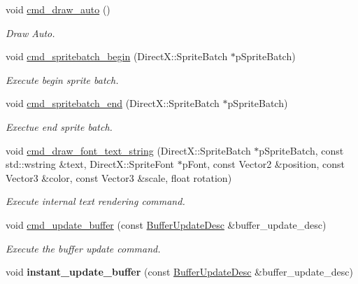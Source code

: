 \begin{DoxyCompactItemize}
void \hyperlink{classDXRenderer_a55c751afe6f80a0b39dbad2d65d75184}{cmd\+\_\+draw\+\_\+auto} ()
\begin{DoxyCompactList}\small\item\em Draw Auto. \end{DoxyCompactList}\item 
void \hyperlink{classDXRenderer_a94f294bbd65dc04cc373d19325f1649e}{cmd\+\_\+spritebatch\+\_\+begin} (Direct\+X\+::\+Sprite\+Batch $\ast$p\+Sprite\+Batch)
\begin{DoxyCompactList}\small\item\em Execute begin sprite batch. \end{DoxyCompactList}\item 
void \hyperlink{classDXRenderer_a711b4dc330c2e3054519d9c0321a97f8}{cmd\+\_\+spritebatch\+\_\+end} (Direct\+X\+::\+Sprite\+Batch $\ast$p\+Sprite\+Batch)
\begin{DoxyCompactList}\small\item\em Exectue end sprite batch. \end{DoxyCompactList}\item 
void \hyperlink{classDXRenderer_a14cb725b85687bb34b712b93550fef45}{cmd\+\_\+draw\+\_\+font\+\_\+text\+\_\+string} (Direct\+X\+::\+Sprite\+Batch $\ast$p\+Sprite\+Batch, const std\+::wstring \&text, Direct\+X\+::\+Sprite\+Font $\ast$p\+Font, const Vector2 \&position, const Vector3 \&color, const Vector3 \&scale, float rotation)
\begin{DoxyCompactList}\small\item\em Execute internal text rendering command. \end{DoxyCompactList}\item 
void \hyperlink{classDXRenderer_ab3e0561b3419a6583505514eb979edba}{cmd\+\_\+update\+\_\+buffer} (const \hyperlink{structBufferUpdateDesc}{Buffer\+Update\+Desc} \&buffer\+\_\+update\+\_\+desc)
\begin{DoxyCompactList}\small\item\em Execute the buffer update command. \end{DoxyCompactList}\item 
\mbox{\label{classDXRenderer_a75fab54cd588ea681f1ac515a487ee36}} 
void {\bfseries instant\+\_\+update\+\_\+buffer} (const \hyperlink{structBufferUpdateDesc}{Buffer\+Update\+Desc} \&buffer\+\_\+update\+\_\+desc)
\item 
\mbox{\label{classDXRenderer_a9c8fd9abd296101a41ae021057810428}} 

\end{DoxyCompactItemize}
